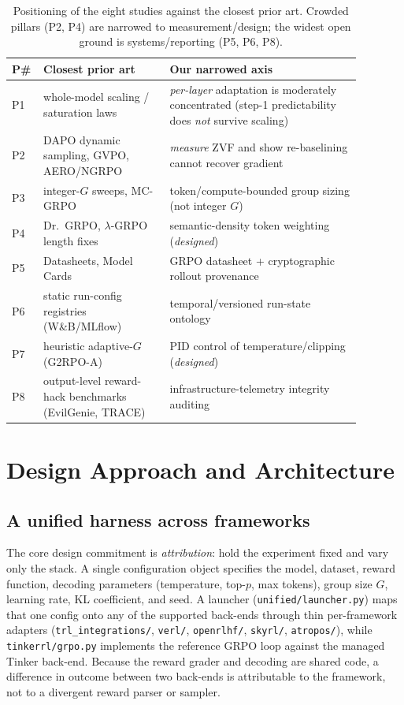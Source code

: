 \documentclass[11pt,a4paper]{article}
\begin{document}
\begin{table}[t]
\centering
\small
\setlength{\tabcolsep}{4pt}
\begin{tabular}{@{}L{0.045\linewidth}L{0.33\linewidth}L{0.50\linewidth}@{}}
\toprule
\textbf{P\#} & \textbf{Closest prior art} & \textbf{Our narrowed axis} \\
\midrule
P1 & whole-model scaling / saturation laws & \emph{per-layer} adaptation is moderately concentrated (step-1 predictability does \emph{not} survive scaling) \\
P2 & DAPO dynamic sampling, GVPO, AERO/NGRPO & \emph{measure} ZVF and show re-baselining cannot recover gradient \\
P3 & integer-$G$ sweeps, MC-GRPO & token/compute-bounded group sizing (not integer $G$) \\
P4 & Dr.\ GRPO, $\lambda$-GRPO length fixes & semantic-density token weighting (\emph{designed}) \\
P5 & Datasheets, Model Cards & GRPO datasheet + cryptographic rollout provenance \\
P6 & static run-config registries (W\&B/MLflow) & temporal/versioned run-state ontology \\
P7 & heuristic adaptive-$G$ (G2RPO-A) & PID control of temperature/clipping (\emph{designed}) \\
P8 & output-level reward-hack benchmarks (EvilGenie, TRACE) & infrastructure-telemetry integrity auditing \\
\bottomrule
\end{tabular}
\caption{Positioning of the eight studies against the closest prior art. Crowded
pillars (P2, P4) are narrowed to measurement/design; the widest open ground is
systems/reporting (P5, P6, P8).}
\label{tab:position}
\end{table}

\section{Design Approach and Architecture}
\label{sec:design}

\subsection{A unified harness across frameworks}

The core design commitment is \emph{attribution}: hold the experiment fixed and
vary only the stack. A single configuration object specifies the model, dataset,
reward function, decoding parameters (temperature, top-$p$, max tokens), group
size $G$, learning rate, KL coefficient, and seed. A launcher
(\texttt{unified/launcher.py}) maps that one config onto any of the supported
back-ends through thin per-framework adapters
(\texttt{trl\_integrations/}, \texttt{verl/}, \texttt{openrlhf/},
\texttt{skyrl/}, \texttt{atropos/}), while \texttt{tinkerrl/grpo.py} implements
the reference GRPO loop against the managed Tinker back-end. Because the reward
grader and decoding are shared code, a difference in outcome between two
back-ends is attributable to the framework, not to a divergent reward parser or
sampler.
\end{document}
